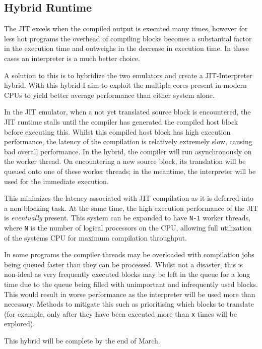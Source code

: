 \subsection{Hybrid Runtime}

The JIT excels when the compiled output is executed many times, however for less hot programs the overhead of compiling blocks becomes a substantial factor in the execution time and outweighs in the decrease in execution time. In these cases an interpreter is a much better choice.

A solution to this is to hybridize the two emulators and create a JIT-Interpreter hybrid. With this hybrid I aim to exploit the multiple cores present in modern CPUs to yield better average performance than either system alone.

In the JIT emulator, when a not yet translated source block is encountered, the JIT runtime stalls until the compiler has generated the compiled host block before executing this. Whilst this compiled host block has high execution performance, the latency of the compilation is relatively extremely slow, causing bad overall performance. In the hybrid, the compiler will run asynchronously on the worker thread. On encountering a new source block, its translation will be queued onto one of these worker threads; in the meantime, the interpreter will be used for the immediate execution.

This minimizes the latency associated with JIT compilation as it is deferred into a non-blocking task. At the same time, the high execution performance of the JIT is \emph{eventually} present. This system can be expanded to have \texttt{N-1} worker threads, where \texttt{N} is the number of logical processors on the CPU, allowing full utilization of the systems CPU for maximum compilation throughput.

In some programs the compiler threads may be overloaded with compilation jobs being queued faster than they can be processed. Whilst not a disaster, this is non-ideal as very frequently executed blocks may be left in the queue for a long time due to the queue being filled with unimportant and infrequently used blocks. This would result in worse performance as the interpreter will be used more than necessary. Methods to mitigate this such as prioritising which blocks to translate (for example, only after they have been executed more than \texttt{x} times will be explored).

This hybrid will be complete by the end of March.